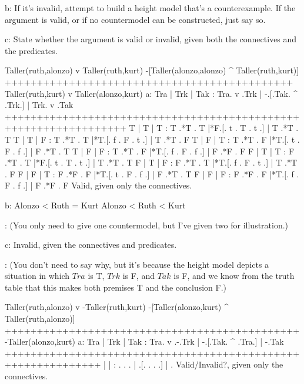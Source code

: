 b: If it's invalid, attempt to build a height model that's a counterexample. If the argument is valid, or if no countermodel can be constructed, just say so.

c: State whether the argument is valid or invalid, given both the connectives and the predicates.
\endlist

\problems
{}
\argument
 Taller(ruth,alonzo) v Taller(ruth,kurt)
 -[Taller(alonzo,alonzo) ^ Taller(ruth,kurt)]
+++++++++++++++++++++++++++++++++++++++++++++
 Taller(ruth,kurt) v Taller(alonzo,kurt)
\endargument
        \answerlist
        a:
        \truthtable
         Tra | Trk | Tak : Tra. v .Trk | -.[.Tak. ^ .Trk.] | Trk. v .Tak
        +++++++++++++++++++++++++++++++++++++++++++++++++++++++++++++++++
          T  |  T  |  T  :  T .*T . T  |*F.[. t . T . t .] |  T .*T . T
          T  |  T  |  F  :  T .*T . T  |*T.[. f . F . t .] |  T .*T . F
          T  |  F  |  T  :  T .*T . F  |*T.[. t . F . f .] |  F .*T . T
          T  |  F  |  F  :  T .*T . F  |*T.[. f . F . f .] |  F .*F . F
          F  |  T  |  T  :  F .*T . T  |*F.[. t . T . t .] |  T .*T . T
          F  |  T  |  F  :  F .*T . T  |*T.[. f . F . t .] |  T .*T . F
          F  |  F  |  T  :  F .*F . F  |*T.[. t . F . f .] |  F .*T . T
          F  |  F  |  F  :  F .*F . F  |*T.[. f . F . f .] |  F .*F . F
        \endtruthtable
        Valid, given only the connectives.

         b:
         \heightmodel
          Alonzo < Ruth = Kurt
         \endheightmodel
         \OR
         \heightmodel
           Alonzo < Ruth < Kurt
         \endheightmodel

:        (You only need to give one countermodel, but I've given two for illustration.)

         c: Invalid, given the connectives and predicates.

:        (You don't need to say why, but it's because the height model depicts a situation in which $Tra$ is T, $Trk$ is F, and $Tak$ is F, and we know from the truth table that this makes both premises T and the conclusion F.)
                                                                                   \endanswerlist

\argument
 Taller(ruth,alonzo) v -Taller(ruth,kurt)
 -[Taller(alonzo,kurt) ^ Taller(ruth,alonzo)]
++++++++++++++++++++++++++++++++++++++++++++++
 -Taller(alonzo,kurt)
\endargument
        \answerlist
        a:
        \truthtable
         Tra | Trk | Tak : Tra. v .-.Trk | -.[.Tak. ^ .Tra.] | -.Tak
        +++++++++++++++++++++++++++++++++++++++++++++++++++++++++++++
             |     |     :    .   . .    |  .[.   .   .   .] |  .  
        \endtruthtable
        Valid/Invalid?, given only the connectives.

